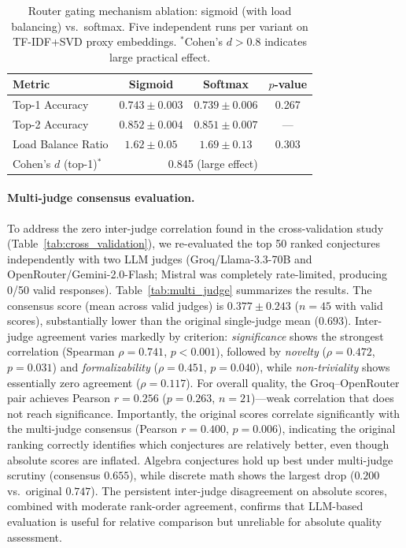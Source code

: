 \documentclass[11pt,a4paper]{article}
\begin{document}
\begin{table}[h]
\centering
\caption{Router gating mechanism ablation: sigmoid (with load balancing) vs.\ softmax. Five independent runs per variant on TF-IDF+SVD proxy embeddings. $^*$Cohen's $d > 0.8$ indicates large practical effect.}
\label{tab:gating_ablation}
\small
\begin{tabular}{@{}lccc@{}}
\toprule
\textbf{Metric} & \textbf{Sigmoid} & \textbf{Softmax} & \textbf{$p$-value} \\
\midrule
Top-1 Accuracy          & $\mathbf{0.743 \pm 0.003}$ & $0.739 \pm 0.006$ & 0.267 \\
Top-2 Accuracy          & $\mathbf{0.852 \pm 0.004}$ & $0.851 \pm 0.007$ & --- \\
Load Balance Ratio      & $\mathbf{1.62 \pm 0.05}$   & $1.69 \pm 0.13$   & 0.303 \\
Cohen's $d$ (top-1)$^*$ & \multicolumn{3}{c}{0.845 (large effect)} \\
\bottomrule
\end{tabular}
\end{table}

\paragraph{Multi-judge consensus evaluation.}
To address the zero inter-judge correlation found in the cross-validation study (Table~\ref{tab:cross_validation}), we re-evaluated the top 50 ranked conjectures independently with two LLM judges (Groq/Llama-3.3-70B and OpenRouter/Gemini-2.0-Flash; Mistral was completely rate-limited, producing 0/50 valid responses). Table~\ref{tab:multi_judge} summarizes the results. The consensus score (mean across valid judges) is $0.377 \pm 0.243$ ($n{=}45$ with valid scores), substantially lower than the original single-judge mean ($0.693$). Inter-judge agreement varies markedly by criterion: \emph{significance} shows the strongest correlation (Spearman $\rho = 0.741$, $p < 0.001$), followed by \emph{novelty} ($\rho = 0.472$, $p = 0.031$) and \emph{formalizability} ($\rho = 0.451$, $p = 0.040$), while \emph{non-triviality} shows essentially zero agreement ($\rho = 0.117$). For overall quality, the Groq--OpenRouter pair achieves Pearson $r = 0.256$ ($p = 0.263$, $n{=}21$)---weak correlation that does not reach significance. Importantly, the original scores correlate significantly with the multi-judge consensus (Pearson $r = 0.400$, $p = 0.006$), indicating the original ranking correctly identifies which conjectures are relatively better, even though absolute scores are inflated. Algebra conjectures hold up best under multi-judge scrutiny (consensus $0.655$), while discrete math shows the largest drop ($0.200$ vs.\ original $0.747$). The persistent inter-judge disagreement on absolute scores, combined with moderate rank-order agreement, confirms that LLM-based evaluation is useful for relative comparison but unreliable for absolute quality assessment.
\end{document}
